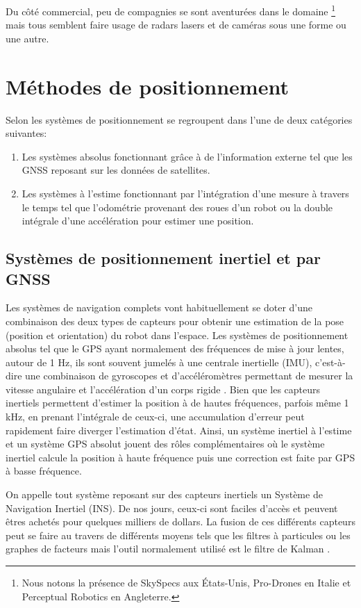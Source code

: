 Du côté commercial, peu de compagnies se sont aventurées dans le domaine \footnote{Nous notons la présence de SkySpecs aux États-Unis, Pro-Drones en Italie et Perceptual Robotics en Angleterre.} mais tous semblent faire usage de radars lasers et de caméras sous une forme ou une autre.

\section{Méthodes de positionnement}\label{subsec:positionnement}

Selon \citep{Borenstein1997} les systèmes de positionnement se regroupent dans l'une de deux catégories suivantes:
\begin{enumerate}
  \item Les systèmes absolus fonctionnant grâce à de l'information externe tel que les GNSS reposant sur les données de satellites.
  \item Les systèmes à l'estime fonctionnant par l'intégration d'une mesure à travers le temps tel que l'odométrie provenant des roues d'un robot ou la double intégrale d'une accélération pour estimer une position.
\end{enumerate}

\subsection{Systèmes de positionnement inertiel et par GNSS}

Les systèmes de navigation complets vont habituellement se doter d'une combinaison des deux types de capteurs pour obtenir une estimation de la pose (position et orientation) du robot dans l'espace. Les systèmes de positionnement absolus tel que le GPS ayant normalement des fréquences de mise à jour lentes, autour de 1 Hz, ils sont souvent jumelés à une centrale inertielle (IMU), c'est-à-dire une combinaison de gyroscopes et d'accéléromètres permettant de mesurer la vitesse angulaire et l'accélération d'un corps rigide \citep{Noureldin2013}. Bien que les capteurs inertiels permettent d'estimer la position à de hautes fréquences, parfois même 1 kHz, en prenant l'intégrale de ceux-ci, une accumulation d'erreur peut rapidement faire diverger l'estimation d'état. Ainsi, un système inertiel à l'estime et un système GPS absolut jouent des rôles complémentaires où le système inertiel calcule la position à haute fréquence puis une correction est faite par GPS à basse fréquence.

On appelle tout système reposant sur des capteurs inertiels un Système de Navigation Inertiel (INS). De nos jours, ceux-ci sont faciles d'accès et peuvent êtres achetés pour quelques milliers de dollars. La fusion de ces différents capteurs peut se faire au travers de différents moyens tels que les filtres à particules \citep{Carvalho1997} ou les graphes de facteurs \citep{Indelman2012} mais l'outil normalement utilisé est le filtre de Kalman \citep{Noureldin2013}.

